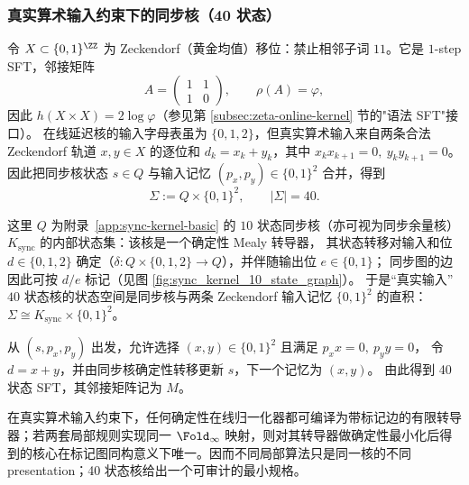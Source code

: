 \subsubsection{真实算术输入约束下的同步核（40 状态）}\label{app:real-input-40-kernel}
令 $X\subset\{0,1\}^{\ZZ}$ 为 Zeckendorf（黄金均值）移位：禁止相邻子词 $11$。它是 $1$-step SFT，邻接矩阵
\[
A=\begin{pmatrix}1&1\\[2pt]1&0\end{pmatrix},\qquad \rho(A)=\varphi,
\]
因此 $h(X\times X)=2\log\varphi$（参见第 \ref{subsec:zeta-online-kernel} 节的"语法 SFT"接口）。
在线延迟核的输入字母表虽为 $\{0,1,2\}$，但真实算术输入来自两条合法 Zeckendorf 轨道
$x,y\in X$ 的逐位和 $d_k=x_k+y_k$，其中 $x_kx_{k+1}=0,\ y_ky_{k+1}=0$。
因此把同步核状态 $s\in Q$ 与输入记忆 $(p_x,p_y)\in\{0,1\}^2$ 合并，得到
\[
\Sigma:=Q\times\{0,1\}^2,\qquad |\Sigma|=40.
\]
\begin{remark}[直积分解与确定性标记]\label{rem:real-input-40-product-kernel}
这里 \(Q\) 为附录~\ref{app:sync-kernel-basic} 的 \(10\) 状态同步核（亦可视为同步余量核）\(K_{\mathrm{sync}}\) 的内部状态集：该核是一个确定性 Mealy 转导器，
其状态转移对输入和位 \(d\in\{0,1,2\}\) 确定（$\delta:Q\times\{0,1,2\}\to Q$），并伴随输出位 \(e\in\{0,1\}\)；
同步图的边因此可按 \(d/e\) 标记（见图 \ref{fig:sync_kernel_10_state_graph}）。
于是“真实输入”\(40\) 状态核的状态空间是同步核与两条 Zeckendorf 输入记忆 \(\{0,1\}^2\) 的直积：
\(\Sigma\cong K_{\mathrm{sync}}\times\{0,1\}^2\)。
\end{remark}
从 $(s,p_x,p_y)$ 出发，允许选择 $(x,y)\in\{0,1\}^2$ 且满足 $p_xx=0,\ p_yy=0$，
令 $d=x+y$，并由同步核确定性转移更新 $s$，下一个记忆为 $(x,y)$。
由此得到 40 状态 SFT，其邻接矩阵记为 $M$。

\begin{remark}[40 状态核的表示唯一性]\label{rem:real-input-40-minimal-kernel}
在真实算术输入约束下，任何确定性在线归一化器都可编译为带标记边的有限转导器；若两套局部规则实现同一 $\Fold_\infty$ 映射，则对其转导器做确定性最小化后得到的核心在标记图同构意义下唯一。因而不同局部算法只是同一核的不同 presentation；40 状态核给出一个可审计的最小规格。
\end{remark}



